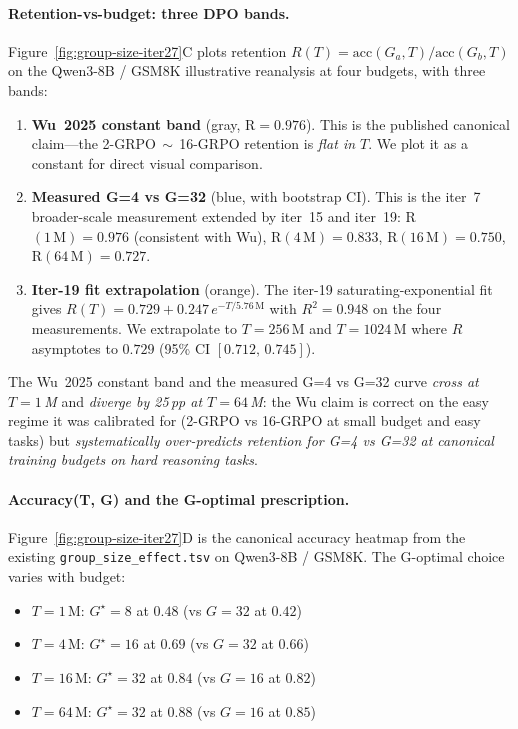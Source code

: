 \paragraph{Retention-vs-budget: three DPO bands.}
Figure~\ref{fig:group-size-iter27}C plots retention $R(T) =
\text{acc}(G_a, T) / \text{acc}(G_b, T)$ on the Qwen3-8B / GSM8K
illustrative reanalysis at four budgets, with three bands:

\begin{enumerate}
  \item \textbf{Wu~2025 constant band} (gray, R$ = 0.976$). This is
        the published canonical claim---the 2-GRPO$\,\sim\,$16-GRPO
        retention is \emph{flat in $T$}. We plot it as a constant for
        direct visual comparison.
  \item \textbf{Measured G=4 vs G=32} (blue, with bootstrap CI).
        This is the iter~7 broader-scale measurement extended by
        iter~15 and iter~19: R$(1\,\text{M}) = 0.976$ (consistent with
        Wu), R$(4\,\text{M}) = 0.833$, R$(16\,\text{M}) = 0.750$,
        R$(64\,\text{M}) = 0.727$.
  \item \textbf{Iter-19 fit extrapolation} (orange). The iter-19
        saturating-exponential fit gives $R(T) = 0.729 + 0.247 \,
        e^{-T/5.76\,\text{M}}$ with $R^2 = 0.948$ on the four
        measurements. We extrapolate to $T{=}256\,$M and $T{=}1024\,$M
        where $R$ asymptotes to $0.729$ (95\% CI $[0.712,\,0.745]$).
\end{enumerate}

The Wu~2025 constant band and the measured G=4 vs G=32 curve
\emph{cross at $T{=}1\,$M} and \emph{diverge by 25\,pp at $T{=}64\,$M}:
the Wu claim is correct on the easy regime it was calibrated for
(2-GRPO vs 16-GRPO at small budget and easy tasks) but
\emph{systematically over-predicts retention for G=4 vs G=32 at
canonical training budgets on hard reasoning tasks}.

\paragraph{Accuracy(T, G) and the G-optimal prescription.}
Figure~\ref{fig:group-size-iter27}D is the canonical accuracy
heatmap from the existing
\texttt{group\_size\_effect.tsv} on Qwen3-8B / GSM8K. The G-optimal
choice varies with budget:

\begin{itemize}
  \item $T{=}1\,$M: $G^\star = 8$ at $0.48$ (vs $G{=}32$ at $0.42$)
  \item $T{=}4\,$M: $G^\star = 16$ at $0.69$ (vs $G{=}32$ at $0.66$)
  \item $T{=}16\,$M: $G^\star = 32$ at $0.84$ (vs $G{=}16$ at $0.82$)
  \item $T{=}64\,$M: $G^\star = 32$ at $0.88$ (vs $G{=}16$ at $0.85$)
\end{itemize}

